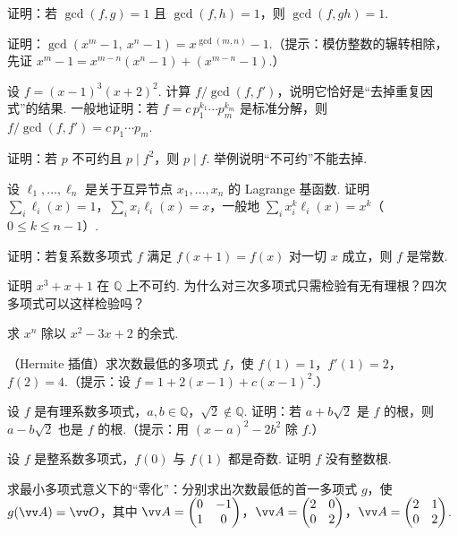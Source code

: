 {		\Bgroup
		\begin{exB}
			\item\label{ex:poly:B1} 证明：若 $\gcd(f,g)=1$ 且 $\gcd(f,h)=1$，则 $\gcd(f,gh)=1$.
			\item\label{ex:poly:B2} 证明：$\gcd(x^m-1,\ x^n-1)=x^{\gcd(m,n)}-1$.（提示：模仿整数的辗转相除，先证 $x^m-1=x^{m-n}(x^n-1)+(x^{m-n}-1)$.）
			\item\label{ex:poly:B3} 设 $f=(x-1)^3(x+2)^2$. 计算 $f/\gcd(f,f')$，说明它恰好是“去掉重复因式”的结果. 一般地证明：若 $f=c\,p_1^{k_1}\cdots p_m^{k_m}$ 是标准分解，则 $f/\gcd(f,f')=c\,p_1\cdots p_m$.
			\item\label{ex:poly:B4} 证明：若 $p$ 不可约且 $p\mid f^2$，则 $p\mid f$. 举例说明“不可约”不能去掉.
			\item\label{ex:poly:B5} 设 $\ell_1,\ldots,\ell_n$ 是关于互异节点 $x_1,\ldots,x_n$ 的 Lagrange 基函数. 证明 $\sum_i\ell_i(x)=1$，$\sum_ix_i\ell_i(x)=x$，一般地 $\sum_ix_i^k\ell_i(x)=x^k$（$0\le k\le n-1$）.
			\item\label{ex:poly:B6} 证明：若复系数多项式 $f$ 满足 $f(x+1)=f(x)$ 对一切 $x$ 成立，则 $f$ 是常数.
			\item\label{ex:poly:B7} 证明 $x^3+x+1$ 在 $\mathbb{Q}$ 上不可约. 为什么对三次多项式只需检验有无有理根？四次多项式可以这样检验吗？
			\item\label{ex:poly:B8} 求 $x^n$ 除以 $x^2-3x+2$ 的余式.
			\item\label{ex:poly:B9} （Hermite 插值）求次数最低的多项式 $f$，使 $f(1)=1$，$f'(1)=2$，$f(2)=4$.（提示：设 $f=1+2(x-1)+c(x-1)^2$.）
			\item\label{ex:poly:B10} 设 $f$ 是有理系数多项式，$a,b\in\mathbb{Q}$，$\sqrt2\notin\mathbb{Q}$. 证明：若 $a+b\sqrt2$ 是 $f$ 的根，则 $a-b\sqrt2$ 也是 $f$ 的根.（提示：用 $(x-a)^2-2b^2$ 除 $f$.）
			\item\label{ex:poly:B11} 设 $f$ 是整系数多项式，$f(0)$ 与 $f(1)$ 都是奇数. 证明 $f$ 没有整数根.
			\item\label{ex:poly:B12} 求最小多项式意义下的“零化”：分别求出次数最低的首一多项式 $g$，使 $g(\vv A)=\vv O$，其中 $\vv A=\begin{pmatrix}0&-1\\1&0\end{pmatrix}$，$\vv A=\begin{pmatrix}2&0\\0&2\end{pmatrix}$，$\vv A=\begin{pmatrix}2&1\\0&2\end{pmatrix}$.

\end{exB}}
